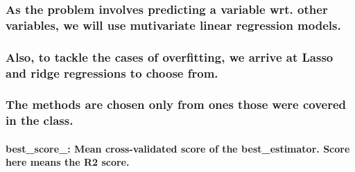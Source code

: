 \documentclass[11pt]{article}
\begin{document}
\subsubsection{As the problem involves predicting a variable wrt. other
variables, we will use mutivariate linear regression
models.}\label{as-the-problem-involves-predicting-a-variable-wrt.-other-variables-we-will-use-mutivariate-linear-regression-models.}

\subsubsection{Also, to tackle the cases of overfitting, we arrive at
Lasso and ridge regressions to choose
from.}\label{also-to-tackle-the-cases-of-overfitting-we-arrive-at-lasso-and-ridge-regressions-to-choose-from.}

\subsubsection{The methods are chosen only from ones those were covered
in the
class.}\label{the-methods-are-chosen-only-from-ones-those-were-covered-in-the-class.}

\paragraph{best\_score\_: Mean cross-validated score of the
best\_estimator. Score here means the R2
score.}\label{best_score_-mean-cross-validated-score-of-the-best_estimator.-score-here-means-the-r2-score.}
\end{document}
